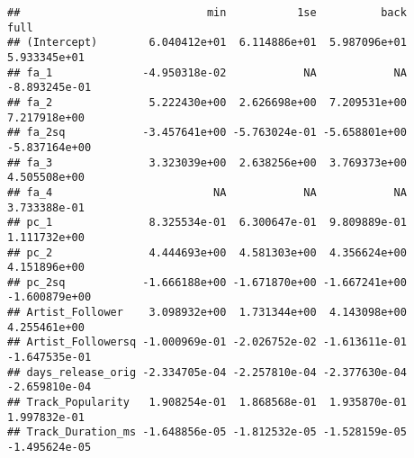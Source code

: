 \documentclass[
]{article}
\newenvironment{Shaded}{\begin{snugshade}}{\end{snugshade}}
\newcommand{\ControlFlowTok}[1]{\textcolor[rgb]{0.13,0.29,0.53}{\textbf{#1}}}
\newcommand{\DataTypeTok}[1]{\textcolor[rgb]{0.13,0.29,0.53}{#1}}
\newcommand{\DecValTok}[1]{\textcolor[rgb]{0.00,0.00,0.81}{#1}}
\newcommand{\KeywordTok}[1]{\textcolor[rgb]{0.13,0.29,0.53}{\textbf{#1}}}
\newcommand{\NormalTok}[1]{#1}
\newcommand{\OperatorTok}[1]{\textcolor[rgb]{0.81,0.36,0.00}{\textbf{#1}}}
\newcommand{\OtherTok}[1]{\textcolor[rgb]{0.56,0.35,0.01}{#1}}
\newcommand{\StringTok}[1]{\textcolor[rgb]{0.31,0.60,0.02}{#1}}
\begin{document}
\begin{Shaded}
\end{Shaded}

\begin{verbatim}
##                             min           1se          back          full
## (Intercept)        6.040412e+01  6.114886e+01  5.987096e+01  5.933345e+01
## fa_1              -4.950318e-02            NA            NA -8.893245e-01
## fa_2               5.222430e+00  2.626698e+00  7.209531e+00  7.217918e+00
## fa_2sq            -3.457641e+00 -5.763024e-01 -5.658801e+00 -5.837164e+00
## fa_3               3.323039e+00  2.638256e+00  3.769373e+00  4.505508e+00
## fa_4                         NA            NA            NA  3.733388e-01
## pc_1               8.325534e-01  6.300647e-01  9.809889e-01  1.111732e+00
## pc_2               4.444693e+00  4.581303e+00  4.356624e+00  4.151896e+00
## pc_2sq            -1.666188e+00 -1.671870e+00 -1.667241e+00 -1.600879e+00
## Artist_Follower    3.098932e+00  1.731344e+00  4.143098e+00  4.255461e+00
## Artist_Followersq -1.000969e-01 -2.026752e-02 -1.613611e-01 -1.647535e-01
## days_release_orig -2.334705e-04 -2.257810e-04 -2.377630e-04 -2.659810e-04
## Track_Popularity   1.908254e-01  1.868568e-01  1.935870e-01  1.997832e-01
## Track_Duration_ms -1.648856e-05 -1.812532e-05 -1.528159e-05 -1.495624e-05
\end{verbatim}
\end{document}
